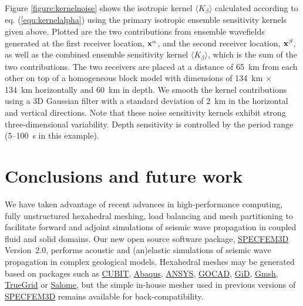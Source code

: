 \documentclass[referee,extra]{gji}
\newcommand{\bx}{ {\bf x } }
\begin{document}
Figure \ref{figure:kernelnoise} shows the isotropic kernel $\langle K_\beta \rangle$
calculated according to eq. (\ref{equ:kernelalpha}) using the primary isotropic ensemble sensitivity kernels given above.
Plotted are the two contributions from ensemble wavefields generated at the first receiver location,
$\bx^\alpha$, and the second receiver location, $\bx^\beta$,
as well as the combined ensemble sensitivity kernel $\langle K_\beta \rangle$, which is the sum of the two contributions.
The two receivers are placed at a distance of 65~km from each other on top of a homogeneous block model with dimensions of 134~km $\times$ 134~km horizontally and 60~km in depth.
We smooth the kernel contributions using a 3D Gaussian filter
with a standard deviation of 2~km in the horizontal and vertical directions.
Note that these noise sensitivity kernels exhibit strong three-dimensional variability.
Depth sensitivity is controlled by the period range (5--100~s in this example).

\section{Conclusions and future work}\label{sec:Conclusions}

We have taken advantage of recent advances in high-performance computing, fully unstructured hexahedral meshing, load balancing and
mesh partitioning to facilitate forward and adjoint simulations of seismic wave propagation in coupled fluid and solid domains.
Our new open source software package,
\href{http://www.geodynamics.org/cig/software/specfem3d}{SPECFEM3D} Version~2.0,
performs acoustic and (an)elastic simulations of seismic wave propagation in complex geological models.
Hexahedral meshes may be generated based on packages such as
\href{http://cubit.sandia.gov}{CUBIT},
\href{http://www.simulia.com/products/abaqus_fea.html}{Abaqus},
\href{http://www.ansys.com/}{ANSYS},
\href{http://www.gocad.org/www/}{GOCAD},
\href{http://gid.cimne.upc.es}{GiD},
\href{http://geuz.org/gmsh}{Gmsh},
\href{http://www.truegrid.com/}{TrueGrid}
or  \href{http://www.salome-platform.org/}{Salome},
but the simple in-house mesher used in previous versions of \href{http://www.geodynamics.org/cig/software/specfem3d}{SPECFEM3D}
remains available for back-compatibility.
\end{document}
